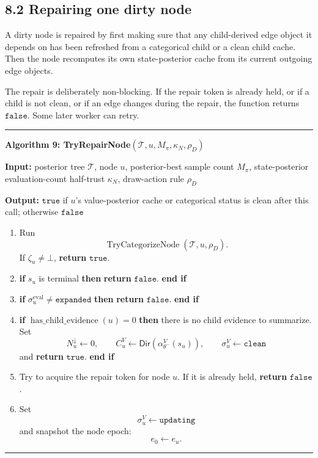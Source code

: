 \documentclass[11pt]{article}
\newcommand{\Tree}{\mathcal{T}}
\newcommand{\DirObj}{\mathsf{Dir}}
\newcommand{\TryCategorizeNode}{\operatorname{TryCategorizeNode}}
\newenvironment{algorithmblock}[1]
{
  \par\medskip
  \noindent\hrule\par\smallskip
  \noindent\textbf{#1}
  \par\smallskip
}
{
  \par\smallskip\noindent\hrule\par\medskip
}
\newcommand{\Input}{\textbf{Input: }}
\newcommand{\Output}{\textbf{Output: }}
\newcommand{\Return}{\textbf{return }}
\newcommand{\If}{\textbf{if }}
\newcommand{\Then}{\textbf{ then }}
\newcommand{\EndIf}{\textbf{end if}}
\begin{document}
\subsection*{8.2 Repairing one dirty node}

A dirty node is repaired by first making sure that any child-derived edge object
it depends on has been refreshed from a categorical child or a clean child
cache. Then the node recomputes its own state-posterior cache from its current
outgoing edge objects.

The repair is deliberately non-blocking. If the repair token is already held, or
if a child is not clean, or if an edge changes during the repair, the function
returns \(\texttt{false}\). Some later worker can retry.

\begin{algorithmblock}{Algorithm 9: TryRepairNode\((\Tree,u,M_\pi,\kappa_N,\rho_D)\)}

\Input posterior tree \(\Tree\), node \(u\), posterior-best sample count \(M_\pi\), state-posterior evaluation-count half-trust \(\kappa_N\), draw-action rule \(\rho_D\)

\Output \(\texttt{true}\) if \(u\)'s value-posterior cache or categorical status is clean after this call; otherwise \(\texttt{false}\)

\begin{enumerate}[leftmargin=2em]
  \item Run
  \[
  \TryCategorizeNode(\Tree,u,\rho_D).
  \]
  If \(\zeta_u\ne\bot\), \Return \(\texttt{true}\).

  \item \If \(s_u\) is terminal \Then \Return \(\texttt{false}\). \EndIf

  \item \If \(\sigma^{\mathrm{eval}}_u\ne\texttt{expanded}\) \Then \Return \(\texttt{false}\). \EndIf

  \item \If \(\operatorname{has\_child\_evidence}(u)=0\) \Then
  there is no child evidence to summarize. Set
  \[
  N^\downarrow_u\gets 0,
  \qquad
  C^V_u\gets\DirObj(\alpha_{\theta^-}^V(s_u)),
  \qquad
  \sigma^V_u\gets\texttt{clean}
  \]
  and \Return \(\texttt{true}\). \EndIf

  \item Try to acquire the repair token for node \(u\). If it is already held,
  \Return \(\texttt{false}\).

  \item Set
  \[
  \sigma^V_u\gets\texttt{updating}
  \]
  and snapshot the node epoch:
  \[
  e_0\gets e_u.
  \]


\end{enumerate}
\end{algorithmblock}
\end{document}
